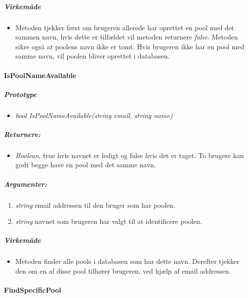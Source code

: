 \subparagraph{Virkemåde}
\begin{itemize}
	\item Metoden tjekker først om brugeren allerede har oprettet en pool med det sammen navn, hvis dette er tilfældet vil metoden returnere \textit{false}. Metoden sikre også at poolens navn ikke er tomt. Hvis brugeren ikke har en pool med samme navn, vil poolen bliver oprettet i databasen.
\end{itemize}

\paragraph{IsPoolNameAvailable}%






\subparagraph{Prototype}
\begin{itemize}
	\item \textit{bool IsPoolNameAvailable(string email, string name)}
\end{itemize}

\subparagraph{Returnere:}
\begin{itemize}
	\item \textit{Boolean}, true hvis navnet er ledigt og false hvis det er taget. To brugere kan godt begge have en pool med det samme navn.
\end{itemize}

\subparagraph{Argumenter:}
\begin{enumerate}
	\item \textit{string} email addressen til den bruger som har poolen.
	\item \textit{string} navnet som brugeren har valgt til at identificere poolen.
\end{enumerate}

\subparagraph{Virkemåde}
\begin{itemize}
	\item Metoden finder alle pools i databasen som har dette navn. Derefter tjekker den om en af disse pool tilhører brugeren, ved hjælp af email addressen.
\end{itemize}









\paragraph{FindSpecificPool}%





